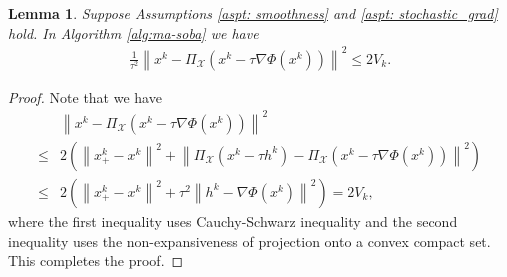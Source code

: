 \documentclass[10pt]{article}
\newtheorem{lemma}{Lemma}[section]
\theoremstyle{remark}
\newcommand{\cX}{\mathcal{X}}
\newcommand{\norm}[1]{\left\|#1\right\|}
\begin{document}
\begin{lemma}\label{lem: x_convergence}
    Suppose Assumptions \ref{aspt: smoothness} and \ref{aspt: stochastic_grad} hold. In Algorithm \ref{alg:ma-soba} we have
    \begin{align*}
        \frac{1}{\tau^2}\norm{x^k - \Pi_{\cX}\left(x^k - \tau\nabla\Phi(x^k)\right) }^2\leq 2V_k.
    \end{align*}
\end{lemma}
\begin{proof}
    Note that we have
    \begin{align*}
        &\norm{x^k - \Pi_{\cX}\left(x^k - \tau\nabla\Phi(x^k)\right)}^2\\
        \leq &2\left(\norm{x_+^k - x^k}^2 + \norm{\Pi_{\cX}\left(x^k - \tau h^k\right) - \Pi_{\cX}\left(x^k - \tau\nabla\Phi(x^k)\right)}^2\right) \\
        \leq &2\left(\norm{x_+^k - x^k}^2 + \tau^2\norm{h^k - \nabla\Phi(x^k) }^2\right) = 2V_k,
    \end{align*}
    where the first inequality uses Cauchy-Schwarz inequality and the second inequality uses the non-expansiveness of projection onto a convex compact set. This completes the proof.
\end{proof}
\end{document}
